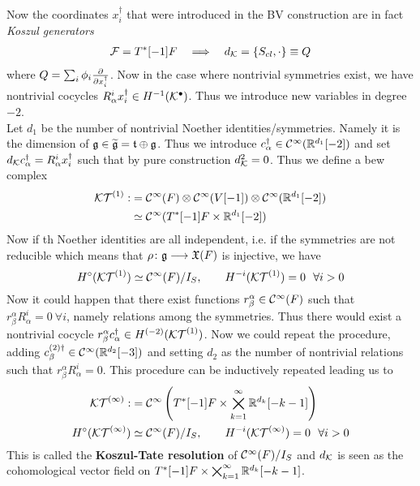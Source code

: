 Now the coordinates $x^\dagger_i$ that were introduced in the BV construction are in fact \emph{Koszul generators}
\begin{align}
  {\mathcal{F}} = T^*[-1]F \quad \Longrightarrow \quad d_{{\mathcal{K}}} = \{ S_{cl}, \cdot \} \equiv Q
\end{align}
where $Q = \sum_i \phi_i \dell{}{x^\dagger_i}$. Now in the case where nontrivial symmetries exist, we have nontrivial cocycles $R^i_\alpha x^\dagger_i \in H^{-1}({\mathcal{K}}^\bullet)$. Thus we introduce new variables in degree $-2$.\\

Let $d_1$ be the number of nontrivial Noether identities/symmetries. Namely it is the dimension of $\mathfrak{g} \in \widetilde{\mathfrak{g}} = \mathfrak{t} \oplus \mathfrak{g}$. Thus we introduce $c^\dagger_\alpha \in \mathcal{C}^{\infty}(\mathbb{R}^{d_1}[-2])$ and set $d_{{\mathcal{K}}} c^\dagger_\alpha = R^i_\alpha x^\dagger_i$ such that by pure construction $d_{{\mathcal{K}}}^2 = 0$. Thus we define a bew complex
\begin{align}
  {\mathcal{KT}}^{(1)} :&= \mathcal{C}^{\infty}(F) \otimes \mathcal{C}^{\infty}(V[-1]) \otimes \mathcal{C}^{\infty}(\mathbb{R}^{d_1}[-2]) \\
  &\simeq \mathcal{C}^{\infty}(T^*[-1]F \times \mathbb{R}^{d_1}[-2])
\end{align}
Now if th Noether identities are all independent, i.e. if the symmetries are not reducible which means that $\rho \colon \mathfrak{g} \longrightarrow \mathfrak{X}(F)$ is injective, we have
\begin{equation}
  H^\circ({\mathcal{KT}}^{(1)}) \simeq \mathcal{C}^{\infty}(F)/I_S, \quad \quad H^{-i}({\mathcal{KT}}^{(1)}) = 0 \ \ \forall i > 0
\end{equation}
Now it could happen that there exist functions $r^\alpha_\beta \in \mathcal{C}^{\infty}(F)$ such that $r^\alpha_\beta R^i_\alpha = 0 \ \forall i$, namely relations among the symmetries. Thus there would exist a nontrivial cocycle $r^\alpha_\beta c^\dagger_\alpha \in H^{(-2)}({\mathcal{KT}}^{(1)})$. Now we could repeat the procedure, adding $c^{(2)\dagger}_\beta \in \mathcal{C}^{\infty}(\mathbb{R}^{d_2}[-3])$ and setting $d_2$ as the number of nontrivial relations such that $r^\alpha_\beta R^i_\alpha = 0$. This procedure can be inductively repeated leading us to
\begin{align}
  {\mathcal{KT}}^{(\infty)} :&= \mathcal{C}^{\infty}\left(T^*[-1]F \times \bigtimes_{k = 1}^\infty \mathbb{R}^{d_k}[-k-1] \right) \\
  H^\circ({\mathcal{KT}}^{(\infty)}) &\simeq \mathcal{C}^{\infty}(F)/I_S, \quad \quad H^{-i}({\mathcal{KT}}^{(\infty)}) = 0 \ \ \forall i > 0
\end{align}
This is called the \textbf{Koszul-Tate resolution} of $\mathcal{C}^{\infty}(F)/I_S$ and $d_{{\mathcal{K}}}$ is seen as the cohomological vector field on $T^*[-1]F \times \bigtimes_{k = 1}^\infty \mathbb{R}^{d_k}[-k-1]$.\\

